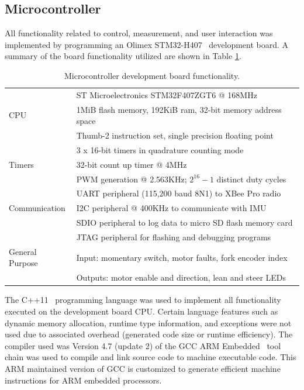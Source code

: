 \subsection{Microcontroller} \label{rb:subsec:mcu} All functionality related to
control, measurement, and user interaction was implemented by programming an
Olimex STM32-H407~\cite{OlimexSTM32H407} development board. A summary of the
board functionality utilized are shown in Table \ref{rb:tab:mcu}.
\begin{table}[htbp]
  \centering
  \begin{tabular}{|l|l|}
    \hline
        & ST Microelectronics STM32F407ZGT6 @ 168MHz \\
    CPU & 1MiB flash memory, 192KiB ram, 32-bit memory address space \\
        & Thumb-2 instruction set, single precision floating point \\
    \hline
           & 3 x 16-bit timers in quadrature counting mode \\
    Timers & 32-bit count up timer @ 4MHz \\
           & PWM generation @ 2.563KHz; $2^{16} - 1$ distinct duty cycles \\
    \hline
                   & UART peripheral (115,200 baud 8N1) to XBee Pro radio \\
    Communication  & I2C peripheral @ 400KHz to communicate with IMU \\
                   & SDIO peripheral to log data to micro SD flash memory card \\
                   & JTAG peripheral for flashing and debugging programs \\
    \hline
    General Purpose & Input: momentary switch, motor faults, fork encoder index \\
                    & Outputs: motor enable and direction, lean and steer LEDs \\
    \hline
  \end{tabular}
  \caption{Microcontroller development board functionality.}
  \label{rb:tab:mcu}
\end{table}
The C++11~\cite{C++11} programming language was used to implement all
functionality executed on the development board CPU. Certain language features
such as dynamic memory allocation, runtime type information, and exceptions
were not used due to associated overhead (generated code size or runtime
efficiency). The compiler used was Version 4.7 (update 2) of the GCC ARM
Embedded~\cite{gccARMEmbedded} tool chain was used to compile and link source
code to machine executable code. This ARM maintained version of GCC is
customized to generate efficient machine instructions for ARM embedded
processors.

